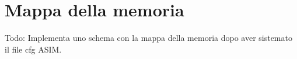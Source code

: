 \documentclass{article}
\begin{document}




\section{Mappa della memoria}
Todo: Implementa uno schema con la mappa della memoria dopo aver sistemato il file cfg ASIM. 
\end{document}
